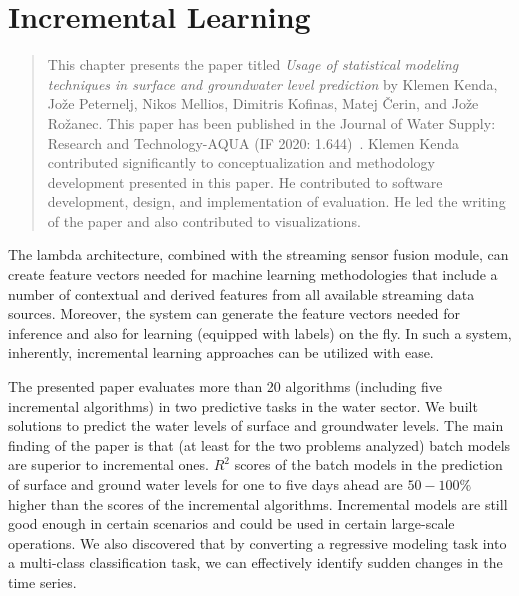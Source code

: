 


\section{Incremental Learning}
\label{section:incremental_learning}

\begin{quote}
This chapter presents the paper titled \textit{Usage of statistical modeling techniques in surface and groundwater level prediction} by Klemen Kenda, Jože Peternelj, Nikos Mellios, Dimitris Kofinas, Matej Čerin, and Jože Rožanec.
This paper has been published in the Journal of Water Supply: Research and Technology-AQUA (IF 2020: 1.644)~\cite{kenda:2020:water-modeling}.
Klemen Kenda contributed significantly to conceptualization and methodology development presented in this paper. 
He contributed to software development, design, and implementation of evaluation.
He led the writing of the paper and also contributed to visualizations.
\end{quote}

The lambda architecture, combined with the streaming sensor fusion module, can create feature vectors needed for machine learning methodologies that include a number of contextual and derived features from all available streaming data sources.
Moreover, the system can generate the feature vectors needed for inference and also for learning (equipped with labels) on the fly.
In such a system, inherently, incremental learning approaches can be utilized with ease.

The presented paper evaluates more than 20 algorithms (including five incremental algorithms) in two predictive tasks in the water sector.
We built solutions to predict the water levels of surface and groundwater levels.
The main finding of the paper is that (at least for the two problems analyzed) batch models are superior to incremental ones.
$R^2$ scores of the batch models in the prediction of surface and ground water levels for one to five days ahead are $50-100\%$ higher than the scores of the incremental algorithms.
Incremental models are still good enough in certain scenarios and could be used in certain large-scale operations.
We also discovered that by converting a regressive modeling task into a multi-class classification task, we can effectively identify sudden changes in the time series.

